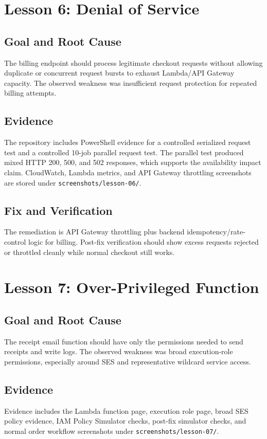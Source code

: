 \documentclass[12pt]{article}
\begin{document}
\section*{Lesson 6: Denial of Service}

\subsection*{Goal and Root Cause}
The billing endpoint should process legitimate checkout requests without allowing duplicate or concurrent request bursts to exhaust Lambda/API Gateway capacity. The observed weakness was insufficient request protection for repeated billing attempts.

\subsection*{Evidence}
The repository includes PowerShell evidence for a controlled serialized request test and a controlled 10-job parallel request test. The parallel test produced mixed HTTP 200, 500, and 502 responses, which supports the availability impact claim. CloudWatch, Lambda metrics, and API Gateway throttling screenshots are stored under \texttt{screenshots/lesson-06/}.

\subsection*{Fix and Verification}
The remediation is API Gateway throttling plus backend idempotency/rate-control logic for billing. Post-fix verification should show excess requests rejected or throttled cleanly while normal checkout still works.

\section*{Lesson 7: Over-Privileged Function}

\subsection*{Goal and Root Cause}
The receipt email function should have only the permissions needed to send receipts and write logs. The observed weakness was broad execution-role permissions, especially around SES and representative wildcard service access.

\subsection*{Evidence}
Evidence includes the Lambda function page, execution role page, broad SES policy evidence, IAM Policy Simulator checks, post-fix simulator checks, and normal order workflow screenshots under \texttt{screenshots/lesson-07/}.
\end{document}
